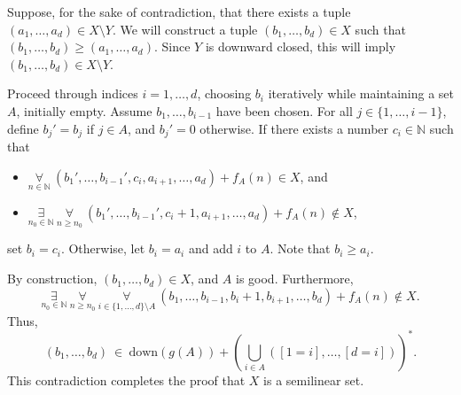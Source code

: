 \documentclass[12pt]{article}
\begin{document}
	\medskip
	
	Suppose, for the sake of contradiction, that there exists a tuple \((a_{1},
	\ldots, a_{d}) \in X \setminus Y\). We will construct a tuple \((b_{1},
	\ldots, b_{d}) \in X\) such that \((b_{1}, \ldots, b_{d}) \geqslant (a_{1},
	\ldots, a_{d})\). Since \(Y\) is downward closed, this will imply \((b_{1},
	\ldots, b_{d}) \in X \setminus Y\).
	
	\medskip
	
	Proceed through indices \(i = 1, \ldots, d\), choosing \(b_{i}\) iteratively
	while maintaining a set \(A\), initially empty. Assume \(b_{1}, \ldots,
	b_{i - 1}\) have been chosen. For all \(j \in \{1, \ldots, i - 1\}\), define
	\(b_{j}' = b_{j}\) if \(j \in A\), and \(b_{j}' = 0\) otherwise. If there
	exists a number \(c_{i} \in \mathbb{N}\) such that
	\begin{itemize}
		\item \(\underset{n \in \mathbb{N}}{\forall} \ (b_{1}', \ldots,
		      b_{i - 1}', c_{i}, a_{i + 1}, \ldots, a_{d}) + f_{A}(n) \in X\),
		      and
		\item \(\underset{n_{0} \in \mathbb{N}}{\exists} \ \underset{n \geqslant
		      n_{0}}{\forall} \ (b_{1}', \ldots, b_{i - 1}', c_{i} + 1,
		      a_{i + 1}, \ldots, a_{d}) + f_{A}(n) \notin X\),
	\end{itemize}
	set \(b_{i} = c_{i}\). Otherwise, let \(b_{i} = a_{i}\) and add \(i\) to
	\(A\). Note that \(b_{i} \geqslant a_{i}\).
	
	\medskip
	
	By construction, \((b_{1}, \ldots, b_{d}) \in X\), and \(A\) is good.
	Furthermore,
	\[ \underset{n_{0} \in \mathbb{N}}{\exists} \ \underset{n \geqslant n_{0}}
	{\forall} \ \underset{i \in \{1, \ldots, d\} \setminus A} {\forall} \
	(b_{1}, \ldots, b_{i - 1}, b_{i} + 1, b_{i + 1}, \ldots, b_{d}) + f_{A}(n)
	\notin X \text{.} \]
	Thus,
	\[ (b_{1}, \ldots, b_{d}) \ \in \ \text{down}(g(A)) + \left(
	\bigcup_{i \in A} ([1 = i], \ldots, [d = i]) \right)^{\ast} \text{.} \]
	This contradiction completes the proof that \(X\) is a semilinear set.
\end{document}
